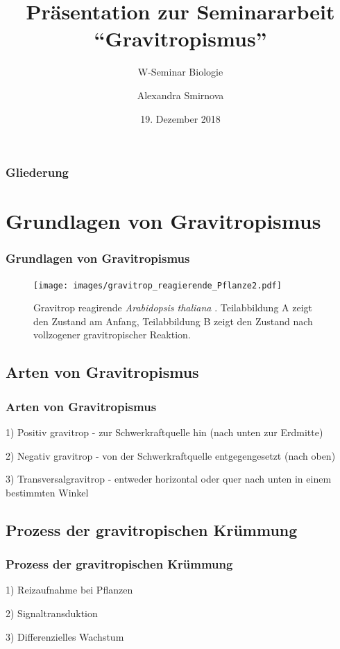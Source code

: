 \documentclass[aspectratio=169]{beamer}
\author{Alexandra Smirnova}
\title{Präsentation zur Seminararbeit \hyphenquote{ngerman}{Gravitropismus}}
\subtitle{W-Seminar Biologie}
\date{19. Dezember 2018}
\begin{document}
	\maketitle
	
	\begin{frame}
		\frametitle{Gliederung}
		\tableofcontents
	\end{frame}
	
	\section{Grundlagen von Gravitropismus}

	
	\begin{frame}
		\frametitle{Grundlagen von Gravitropismus}
		\begin{figure}[H]
			\centering 
			\texttt{[image: images/gravitrop\_reagierende\_Pflanze2.pdf]}
			\caption{Gravitrop reagirende \emph{Arabidopsis thaliana} \parencite[5]{Masson2002}. Teilabbildung A zeigt den Zustand am Anfang, Teilabbildung B zeigt den Zustand nach vollzogener gravitropischer Reaktion. \label{gravitrop_reagierende_Pflanze}}
		\end{figure} 
	\end{frame}
	
	\subsection{Arten von Gravitropismus}
	
	\begin{frame}
		\frametitle{Arten von Gravitropismus}
		1) Positiv gravitrop - zur Schwerkraftquelle hin (nach unten zur Erdmitte)
		
		2) Negativ gravitrop - von der Schwerkraftquelle entgegengesetzt (nach oben)
		
		3) Transversalgravitrop - entweder horizontal oder quer nach unten in einem bestimmten Winkel 
		
	\end{frame}
	
	\subsection{Prozess der gravitropischen Krümmung}
	
	\begin{frame}
		\frametitle{Prozess der gravitropischen Krümmung}
		
		1) Reizaufnahme bei Pflanzen
		
		2) Signaltransduktion
		
		3) Differenzielles Wachstum
		
	\end{frame}
		
\end{document}
